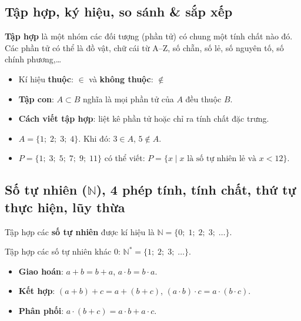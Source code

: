 \documentclass[12pt,a4paper]{article}
\begin{document}
\subsection{Tập hợp, ký hiệu, so sánh \& sắp xếp}

\begin{dinhnghia}
\textbf{Tập hợp} là một nhóm các đối tượng (phần tử) có chung một tính chất nào đó. Các phần tử có thể là đồ vật, chữ cái từ A--Z, số chẵn, số lẻ, số nguyên tố, số chính phương,\ldots
\end{dinhnghia}

\begin{tinhchat}
\begin{itemize}
  \item Kí hiệu \textbf{thuộc}: $\in$ và \textbf{không thuộc}: $\notin$
  \item \textbf{Tập con}: $A \subset B$ nghĩa là mọi phần tử của $A$ đều thuộc $B$.
  \item \textbf{Cách viết tập hợp}: liệt kê phần tử hoặc chỉ ra tính chất đặc trưng.
\end{itemize}
\end{tinhchat}

\begin{vidu}
\begin{itemize}
  \item $A = \{1;\; 2;\; 3;\; 4\}$. Khi đó: $3 \in A$, $5 \notin A$.
  \item $P = \{1;\; 3;\; 5;\; 7;\; 9;\; 11\}$ có thể viết: $P = \{x \mid x \text{ là số tự nhiên lẻ và } x < 12\}$.
\end{itemize}
\end{vidu}

\subsection{Số tự nhiên ($\mathbb{N}$), 4 phép tính, tính chất, thứ tự thực hiện, lũy thừa}

\begin{dinhnghia}
Tập hợp các \textbf{số tự nhiên} được kí hiệu là $\mathbb{N} = \{0;\; 1;\; 2;\; 3;\; \ldots\}$.

Tập hợp các số tự nhiên khác $0$: $\mathbb{N}^{*} = \{1;\; 2;\; 3;\; \ldots\}$.
\end{dinhnghia}

\begin{tinhchat}[title={Tính chất các phép tính}]
\begin{itemize}
  \item \textbf{Giao hoán}: $a + b = b + a$, \quad $a \cdot b = b \cdot a$.
  \item \textbf{Kết hợp}: $(a + b) + c = a + (b + c)$, \quad $(a \cdot b) \cdot c = a \cdot (b \cdot c)$.
  \item \textbf{Phân phối}: $a \cdot (b + c) = a \cdot b + a \cdot c$.
\end{itemize}
\end{tinhchat}
\end{document}
